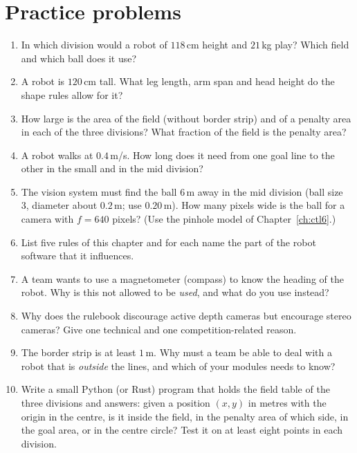 \section*{Practice problems}
\begin{enumerate}[label=\textbf{\thechapter.\arabic*}]
  \item In which division would a robot of $118$\,cm height and $21$\,kg play? Which field and which ball does it use?
  \item A robot is $120$\,cm tall. What leg length, arm span and head height do the shape rules allow for it?
  \item How large is the area of the field (without border strip) and of a penalty area in each of the three divisions? What fraction of the field is the penalty area?
  \item A robot walks at $0.4$\,m/s. How long does it need from one goal line to the other in the small and in the mid division?
  \item The vision system must find the ball $6$\,m away in the mid division (ball size 3, diameter about $0.2$\,m; use $0.20$\,m). How many pixels wide is the ball for a camera with $f=640$ pixels? (Use the pinhole model of Chapter~\ref{ch:ctl6}.)
  \item List five rules of this chapter and for each name the part of the robot software that it influences.
  \item A team wants to use a magnetometer (compass) to know the heading of the robot. Why is this not allowed to be \emph{used}, and what do you use instead?
  \item Why does the rulebook discourage active depth cameras but encourage stereo cameras? Give one technical and one competition-related reason.
  \item The border strip is at least $1$\,m. Why must a team be able to deal with a robot that is \emph{outside} the lines, and which of your modules needs to know?
  \item[\textbf{\thechapter.10}$\star$] Write a small Python (or Rust) program that holds the field table of the three divisions and answers: given a position $(x,y)$ in metres with the origin in the centre, is it inside the field, in the penalty area of which side, in the goal area, or in the centre circle? Test it on at least eight points in each division.
\end{enumerate}

